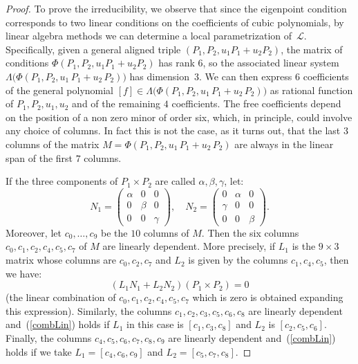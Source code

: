 \documentclass{amsart}
\theoremstyle{plain}
\theoremstyle{definition}
\newcommand{\sL}{\mathcal{L}}
\begin{document}
\begin{proof}
To prove the irreducibility, we observe that since the eigenpoint condition corresponds to two linear conditions on the coefficients of cubic polynomials, by linear algebra methods we can determine a local parametrization of~$\sL$.
Specifically, given a general aligned triple $(P_1, P_2, u_1 P_1 +u_2P_2)$, the matrix of conditions $\Phi(P_1, P_2, u_1 P_1 +u_2P_2)$ has rank $6$, so the associated linear system
$\Lambda \bigl( \Phi(P_1, P_2, u_1 \, P_1 + u_2 \, P_2) \bigr)$ has dimension~$3$. We can then express $6$ coefficients of the general polynomial
$[f]\in \Lambda \bigl( \Phi(P_1, P_2, u_1 \, P_1 + u_2 \, P_2) \bigr)$ as rational function of $P_1,P_2,u_1,u_2$ and of the remaining $4$ coefficients. The free coefficients depend on the position of a non zero minor of order six, which, in principle, could involve any choice of columns. In fact this is not the case, as it turns out, that the last $3$ columns of the matrix
$M = \Phi(P_1, P_2, u_1 \, P_1 + u_2 \, P_2)$ are always in the linear span of the first $7$ columns.

If the three components of $P_1 \times P_2$ are called $\alpha, \beta, \gamma$, let:
%
\[
  N_1 = \left(
  \begin{array}{ccc}
    \alpha & 0 & 0 \\
    0 & \beta & 0\\
    0 & 0 & \gamma
  \end{array}
  \right), \quad
  N_2 = \left(
  \begin{array}{ccc}
    0 & \alpha & 0 \\
    \gamma & 0 & 0\\
    0 & 0 & \beta
  \end{array}
  \right).
\]
%
Moreover, let $c_0, \dots, c_9$ be the $10$ columns of $M$. Then the six
columns $c_0, c_1, c_2, c_4, c_5, c_7$ of $M$ are linearly dependent. More
precisely, if $L_1$ is the $9\times 3$ matrix whose columns are
$c_0, c_2, c_7$ and $L_2$ is given by the columns $c_1, c_4, c_5$,
then we have:
%
\begin{equation}
  (L_1 N_1 + L_2N_2) (P_1 \times P_2) = 0
  \label{combLin}
\end{equation}
%
(the linear combination of $c_0, c_1, c_2, c_4, c_5, c_7$ which is zero
is obtained expanding this expression).
Similarly, the columns $c_1, c_2, c_3, c_5, c_6, c_8$ are linearly dependent
and~(\ref{combLin}) holds if $L_1$ in this case is $[c_1, c_3, c_8]$ and
$L_2$ is $[c_2, c_5, c_6]$. Finally, the columns
$c_4, c_5, c_6, c_7, c_8, c_9$ are linearly dependent and~(\ref{combLin})
holds if we take $L_1 = [c_4, c_6, c_9]$ and $L_2 = [c_5, c_7, c_8]$.


\end{proof}
\end{document}
